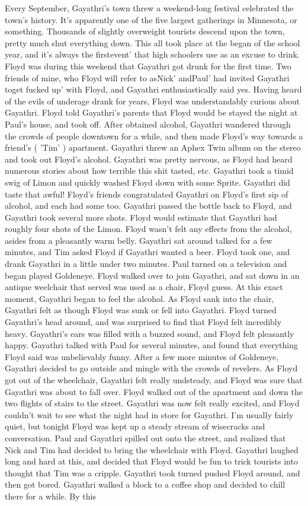\documentclass[12pt]{book}
\begin{document}
Every September, Gayathri's town threw a weekend-long festival celebrated the town's history. It's apparently one of the five largest gatherings in Minnesota, or something. Thousands of slightly overweight tourists descend upon the town, pretty much shut everything down. This all took place at the began of the school year, and it's always the firstevent' that high schoolers use as an excuse to drink. Floyd was during this weekend that Gayathri got drunk for the first time. Two friends of mine, who Floyd will refer to asNick' andPaul' had invited Gayathri toget fucked up' with Floyd, and Gayathri enthusiastically said yes. Having heard of the evils of underage drank for years, Floyd was understandably curious about Gayathri. Floyd told Gayathri's parents that Floyd would be stayed the night at Paul's house, and took off. After obtained alcohol, Gayathri wandered through the crowds of people downtown for a while, and then made Floyd's way towards a friend's ( 'Tim' ) apartment. Gayathri threw an Aphex Twin album on the stereo and took out Floyd's alcohol. Gayathri was pretty nervous, as Floyd had heard numerous stories about how terrible this shit tasted, etc. Gayathri took a timid swig of Limon and quickly washed Floyd down with some Sprite. Gayathri did taste that awful! Floyd's friends congratulated Gayathri on Floyd's first sip of alcohol, and each had some too. Gayathri passed the bottle back to Floyd, and Gayathri took several more shots. Floyd would estimate that Gayathri had roughly four shots of the Limon. Floyd wasn't felt any effects from the alcohol, asides from a pleasantly warm belly. Gayathri sat around talked for a few minutes, and Tim asked Floyd if Gayathri wanted a beer. Floyd took one, and drank Gayathri in a little under two minutes. Paul turned on a television and began played Goldeneye. Floyd walked over to join Gayathri, and sat down in an antique weelchair that served was used as a chair, Floyd guess. At this exact moment, Gayathri began to feel the alcohol. As Floyd sank into the chair, Gayathri felt as though Floyd was sunk or fell into Gayathri. Floyd turned Gayathri's head around, and was surprised to find that Floyd felt incredibly heavy. Gayathri's ears was filled with a buzzed sound, and Floyd felt pleasantly happy. Gayathri talked with Paul for several minutes, and found that everything Floyd said was unbelievably funny. After a few more minutes of Goldeneye, Gayathri decided to go outside and mingle with the crowds of revelers. As Floyd got out of the wheelchair, Gayathri felt really undsteady, and Floyd was sure that Gayathri was about to fall over. Floyd walked out of the apartment and down the two flights of stairs to the street. Gayathri was now felt really excited, and Floyd couldn't wait to see what the night had in store for Gayathri. I'm usually fairly quiet, but tonight Floyd was kept up a steady stream of wisecracks and conversation. Paul and Gayathri spilled out onto the street, and realized that Nick and Tim had decided to bring the wheelchair with Floyd. Gayathri laughed long and hard at this, and decided that Floyd would be fun to trick tourists into thought that Tim was a cripple. Gayathri took turned pushed Floyd around, and then got bored. Gayathri walked a block to a coffee shop and decided to chill there for a while. By this 
\end{document}
